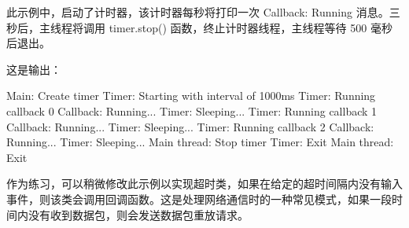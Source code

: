 此示例中，启动了计时器，该计时器每秒将打印一次 Callback: Running 消息。三秒后，主线程将调用 timer.stop() 函数，终止计时器线程，主线程等待 500 毫秒后退出。

这是输出：

\begin{shell}
Main: Create timer
Timer: Starting with interval of 1000ms
Timer: Running callback 0
Callback: Running...
Timer: Sleeping...
Timer: Running callback 1
Callback: Running...
Timer: Sleeping...
Timer: Running callback 2
Callback: Running...
Timer: Sleeping...
Main thread: Stop timer
Timer: Exit
Main thread: Exit
\end{shell}

作为练习，可以稍微修改此示例以实现超时类，如果在给定的超时间隔内没有输入事件，则该类会调用回调函数。这是处理网络通信时的一种常见模式，如果一段时间内没有收到数据包，则会发送数据包重放请求。























